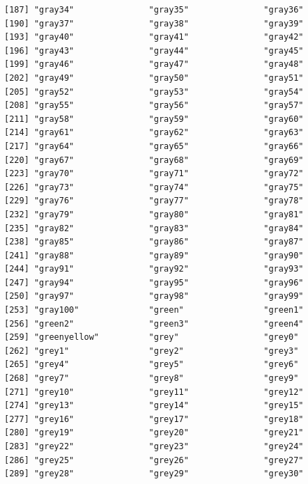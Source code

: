 \documentclass[a4paperpaper,]{article}
\theoremstyle{definition}
\theoremstyle{definition}
\theoremstyle{definition}
\theoremstyle{remark}
\begin{document}
\begin{verbatim}
[187] "gray34"               "gray35"               "gray36"              
[190] "gray37"               "gray38"               "gray39"              
[193] "gray40"               "gray41"               "gray42"              
[196] "gray43"               "gray44"               "gray45"              
[199] "gray46"               "gray47"               "gray48"              
[202] "gray49"               "gray50"               "gray51"              
[205] "gray52"               "gray53"               "gray54"              
[208] "gray55"               "gray56"               "gray57"              
[211] "gray58"               "gray59"               "gray60"              
[214] "gray61"               "gray62"               "gray63"              
[217] "gray64"               "gray65"               "gray66"              
[220] "gray67"               "gray68"               "gray69"              
[223] "gray70"               "gray71"               "gray72"              
[226] "gray73"               "gray74"               "gray75"              
[229] "gray76"               "gray77"               "gray78"              
[232] "gray79"               "gray80"               "gray81"              
[235] "gray82"               "gray83"               "gray84"              
[238] "gray85"               "gray86"               "gray87"              
[241] "gray88"               "gray89"               "gray90"              
[244] "gray91"               "gray92"               "gray93"              
[247] "gray94"               "gray95"               "gray96"              
[250] "gray97"               "gray98"               "gray99"              
[253] "gray100"              "green"                "green1"              
[256] "green2"               "green3"               "green4"              
[259] "greenyellow"          "grey"                 "grey0"               
[262] "grey1"                "grey2"                "grey3"               
[265] "grey4"                "grey5"                "grey6"               
[268] "grey7"                "grey8"                "grey9"               
[271] "grey10"               "grey11"               "grey12"              
[274] "grey13"               "grey14"               "grey15"              
[277] "grey16"               "grey17"               "grey18"              
[280] "grey19"               "grey20"               "grey21"              
[283] "grey22"               "grey23"               "grey24"              
[286] "grey25"               "grey26"               "grey27"              
[289] "grey28"               "grey29"               "grey30"              

\end{verbatim}
\end{document}
